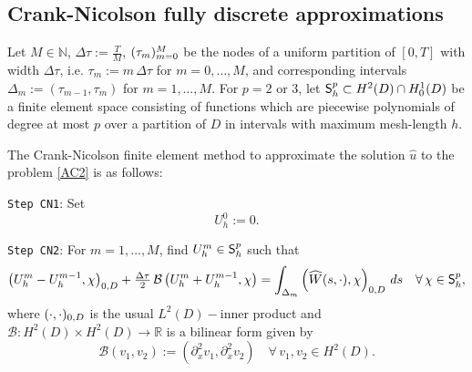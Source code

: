 \documentclass[10pt]{amsart}
\numberwithin{equation}{section}
\begin{document}
\subsection{Crank-Nicolson fully discrete approximations}\label{CN_Main}
Let $M\in{{\mathbb N}}$, ${\Delta\tau}:=\tfrac{T}{M}$, $(\tau_m)_{m=0}^{{\scriptscriptstyle} M}$
be the nodes of a uniform partition of $[0,T]$ with width ${\Delta\tau}$, i.e. 
$\tau_m:=m\,{\Delta\tau}$ for $m=0,\dots,M$, and corresponding intervals
$\Delta_m:=(\tau_{m-1},\tau_m)$ for $m=1,\dots,M$.
For $p=2$ or $3$, let ${\sf S}_h^p\subset H^2(D)\cap H_0^1(D)$ be
a finite element space consisting of functions which are piecewise
polynomials of degree at most $p$ over a partition of $D$ in
intervals with maximum mesh-length $h$.
\par
The Crank-Nicolson finite element method to approximate the solution
${\widehat u}$ to the problem \eqref{AC2} is as follows:
\par
{\tt Step CN1}: Set
\begin{equation}\label{FullDE1}
U_h^0:=0.
\end{equation}
\par
{\tt Step CN2}: For $m=1,\dots,M$, find $U_h^m\in{\sf S}_h^p$ such that
\begin{equation}\label{FullDE2}
\left(U_h^m-U_h^{m-1},\chi\right)_{{\scriptscriptstyle} 0,D}
+\tfrac{\Delta\tau}{2}\,{\mathcal B}\left(U_h^m+U_h^{m-1},\chi\right)
=\int_{{\scriptscriptstyle}\Delta_m} \left({\widehat W}(s,\cdot),\chi\right)_{{\scriptscriptstyle} 0,D}\,ds
\quad\forall\,\chi\in{\sf S}_h^p,
\end{equation}
where $(\cdot,\cdot)_{{\scriptscriptstyle} 0,D}$ is the usual $L^2(D)-$inner product
and ${\mathcal B}:H^2(D)\times H^2(D)\to{\mathbb R}$ is a bilinear form given
by
\begin{equation*}
{\mathcal B}(v_1,v_2):=(\partial_x^2v_1,\partial_x^2v_2)
\quad\forall\,v_1, v_2 \in H^2(D).
\end{equation*}
\end{document}
